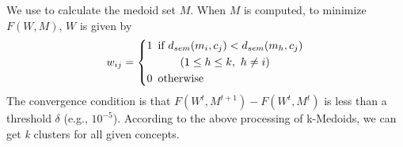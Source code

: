 We use  to calculate the medoid set $M$.
When $M$ is computed, to minimize $F(W, M)$, $W$ is given by
\begin{equation}
\label{eq:weight}
\noindent {w_{ij} = \left\{
\begin{aligned}
1 & \hspace*{5pt} \mbox{if}~ d_{sem}(m_{i},c_{j}) < d_{sem}(m_{h},c_{j})\\
 & \hspace*{25pt} (1 \leq h \leq k,~h \neq i)\\
0 & \hspace*{5pt} \mbox{otherwise}
\end{aligned}
\right.}
\end{equation}
The convergence condition is that $F(W^{t}, M^{t+1})- F(W^{t}, M^{t})$
is less than a threshold $\delta$ (e.g., $10^{-5}$).
According to the above processing of k-Medoids, we can get \emph{k} clusters for all given concepts.


